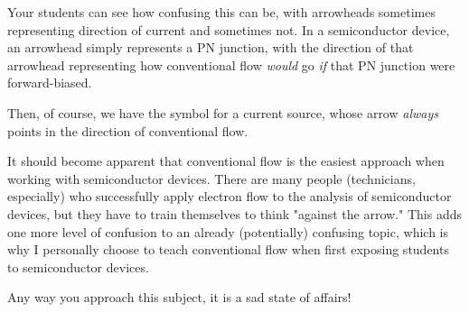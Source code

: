 





Your students can see how confusing this can be, with arrowheads sometimes representing direction of current and sometimes not.  In a semiconductor device, an arrowhead simply represents a PN junction, with the direction of that arrowhead representing how conventional flow {\it would} go {\it if} that PN junction were forward-biased.

Then, of course, we have the symbol for a current source, whose arrow {\it always} points in the direction of conventional flow.

\vskip 10pt

It should become apparent that conventional flow is the easiest approach when working with semiconductor devices.  There are many people (technicians, especially) who successfully apply electron flow to the analysis of semiconductor devices, but they have to train themselves to think "against the arrow."  This adds one more level of confusion to an already (potentially) confusing topic, which is why I personally choose to teach conventional flow when first exposing students to semiconductor devices.

\vskip 10pt

Any way you approach this subject, it is a sad state of affairs!




